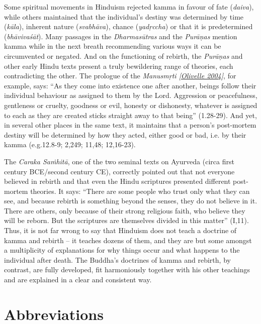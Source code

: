 Some spiritual movements in Hinduism rejected kamma in favour of fate
(\emph{daiva}), while others maintained that the individual's destiny
was determined by time (\emph{kāla}), inherent nature (\emph{svabhāva}),
chance (\emph{yadṛccha}) or that it is predetermined
(\emph{bhāvivaśāt}). Many passages in the \emph{Dharmasūtras} and the
\emph{Purāṇas} mention kamma while in the next breath recommending
various ways it can be circumvented or negated. And on the functioning
of rebirth, the \emph{Purāṇas} and other early Hindu texts present a
truly bewildering range of theories, each contradicting the other. The
prologue of the \emph{{Manusmṛti
{{[}\hyperref[footprints_split_022.htmlux5cux23Olivelleux5cux25202004]{Olivelle
2004}{]}}}}, for example, says: ``As they come into existence one after
another, beings follow their individual behaviour as assigned to them by
the Lord. Aggression or peacefulness, gentleness or cruelty, goodness or
evil, honesty or dishonesty, whatever is assigned to each as they are
created sticks straight away to that being'' (1.28-29). And yet, in
several other places in the same text, it maintains that a person's
post-mortem destiny will be determined by how they acted, either good or
bad, i.e. by their kamma (e.g.12.8-9; 2,249; 11,48; 12,16-23).

The \emph{Caraka Saṁhitā}, one of the two seminal texts on Ayurveda
(circa first century BCE/second century CE), correctly pointed out that
not everyone believed in rebirth and that even the Hindu scriptures
presented different post-mortem theories. It says: ``There are some
people who trust only what they can see, and because rebirth is
something beyond the senses, they do not believe in it. There are
others, only because of their strong religious faith, who believe they
will be reborn. But the scriptures are themselves divided in this
matter'' (I,11). Thus, it is not far wrong to say that Hinduism does not
teach a doctrine of kamma and rebirth -- it teaches dozens of them, and
they are but some amongst a multiplicity of explanations for why things
occur and what happens to the individual after death. The Buddha's
doctrines of kamma and rebirth, by contrast, are fully developed, fit
harmoniously together with his other teachings and are explained in a
clear and consistent way.

\label{footprints_split_020.html_calibre_pb_41}

\label{footprints_split_021.html}{}

\section{Abbreviations}\label{footprints_split_021.html_TOCTarget999-3}

